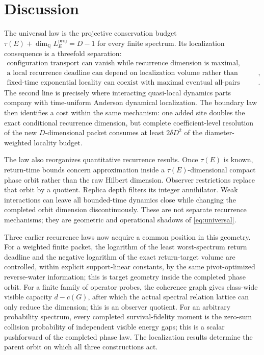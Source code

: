 \documentclass[10pt]{article}
\theoremstyle{definition}
\newcommand{\Q}{\mathbb Q}
\begin{document}
\section{Discussion}

The universal law is the projective conservation budget
\(\tau(E)+\dim_\Q L_E^{\mathrm{proj}}=D-1\) for every finite spectrum.
Its localization consequence is a threefold separation:
\begin{equation}
 \boxed{
 \begin{gathered}
 \text{configuration transport can vanish while recurrence dimension is
 maximal},\\
 \text{a local recurrence deadline can depend on localization volume
 rather than ambient dimension},\\
 \text{fixed-time exponential locality can coexist with maximal eventual
 all-pairs influence}.
 \end{gathered}}
 \label{eq:separation}
\end{equation}
The second line is precisely where interacting quasi-local dynamics parts
company with time-uniform Anderson dynamical localization. The boundary law
then identifies a cost within the same mechanism: one added site doubles
the exact conditional recurrence dimension, but complete coefficient-level
resolution of the new \(D\)-dimensional packet consumes at least
\(2\delta D^2\) of the diameter-weighted locality budget.

The law also reorganizes quantitative recurrence results. Once
\(\tau(E)\) is known, return-time bounds concern approximation inside a
\(\tau(E)\)-dimensional compact phase orbit rather than the raw Hilbert
dimension. Observer restrictions replace that orbit by a quotient.
Replica depth filters its integer annihilator. Weak interactions can leave
all bounded-time dynamics close while changing the completed orbit
dimension discontinuously. These are not separate recurrence mechanisms;
they are geometric and operational shadows of
\eqref{eq:universal}.

Three earlier recurrence laws now acquire a common position in this
geometry. For a weighted finite packet, the logarithm of the least
worst-spectrum return deadline and the negative logarithm of the exact
return-target volume are controlled, within explicit support-linear
constants, by the same pivot-optimized reverse-water information; this is
target geometry inside the completed phase orbit. For a finite family of
operator probes, the coherence graph gives class-wide visible capacity
\(d-c(G)\), after which the actual spectral relation lattice can only reduce
the dimension; this is an observer quotient. For an arbitrary probability
spectrum, every completed survival-fidelity moment is the zero-sum
collision probability of independent visible energy gaps; this is a scalar
pushforward of the completed phase law. The localization results determine
the parent orbit on which all three constructions act.
\end{document}
